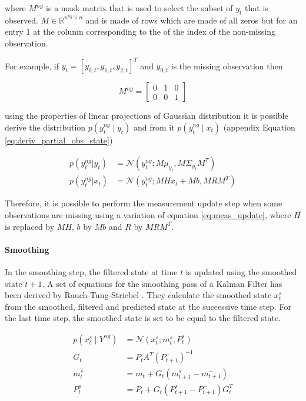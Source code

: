 \documentclass{article}
\newcommand{\norm}[3]{\mathcal{N}\left(#1; #2, #3\right)} %
\begin{document}
where $M^{ng}$ is a mask matrix that is used to select the subset of $y_t$ that is observed. $M \in \mathbb{R}^{n^{ng} \times n}$ and is made of rows which are made of all zeros but for an entry 1 at the column corresponding to the of the index of the non-missing observation.

For example, if $y_t = [y_{0,t}, y_{1,t}, y_{2,t}]^T$ and $y_{0,t}$ is the missing observation then

\begin{equation}
 M^{ng} = \left[\begin{array}{ccc}
    0 & 1 & 0 \\
    0 & 0 & 1
\end{array}\right]
\end{equation}

 using the properties of linear projections of Gaussian distribution it is possible derive the distribution $p(y^{ng}_t \mid y_t)$ and from it $p(y^{ng}_t \mid x_t)$ (appendix Equation \ref{eq:deriv_partial_obs_state})

\begin{align}
   p(y^{ng}_t|y_t) &= \norm{y^{ng}_t}{M\mu_{y_t}}{M\Sigma_{y_t}M^T} \label{eq:partial_obs}\\
  p(y^{ng}_t|x_t) &= \norm{y^{ng}_t}{MHx_t + Mb}{MRM^T}\label{eq:partial_obs_state}
\end{align}

Therefore, it is possible to perform the measurement update step when some observations are missing using a variation of equation \ref{eq:meas_update}, where $H$ is replaced by $MH$, $b$ by $Mb$ and $R$ by $MRM^T$.

\paragraph{Smoothing}

In the smoothing step, the filtered state at time $t$ is updated using the smoothed state ${t+1}$. A set of equations for the smoothing pass of a Kalman Filter has been derived by Rauch-Tung-Striebel \cite{rauch_maximum_1965}. They calculate the smoothed state $x_t^s$ from the smoothed, filtered and predicted state at the successive time step.
For the last time step, the smoothed state is set to be equal to the filtered state.

\begin{align}
    p(x_t^s \mid Y^{ng}) &= \norm{x_t^s}{m_t^s}{P_t^s} \label{eq:smoother}\\
    G_t &= P_tA^T(P_{t+1}^-)^{-1} \label{eq:smoother:gain}\\
    m_t^s &= m_t + G_t(m_{t+1}^s - m_{t+1}^-) \label{eq:smoother:mean}\\
    P_t^s &= P_t + G_t(P_{t+1}^s - P_{t+1}^-)G_t^T \label{eq:smoother:cov}
\end{align}
\end{document}
